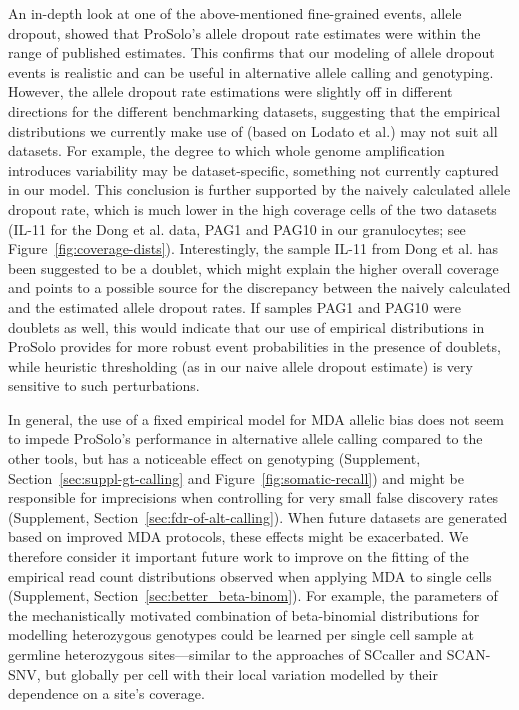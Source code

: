 \documentclass[12pt,inline]{wlscirep}
\begin{document}
An in-depth look at one of the above-mentioned fine-grained events, allele dropout, showed that ProSolo's allele dropout rate estimates were within the range of published estimates.
This confirms that our modeling of allele dropout events is realistic and can be useful in alternative allele calling and genotyping.
However, the allele dropout rate estimations were slightly off in different directions for the different benchmarking datasets, suggesting that the empirical distributions we currently make use of (based on Lodato et al.\cite{lodato_somatic_2015}) may not suit all datasets.
For example, the degree to which whole genome amplification introduces variability may be dataset-specific, something not currently captured in our model.
This conclusion is further supported by the naively calculated allele dropout rate, which is much lower in the high coverage cells of the two datasets (IL-11 for the Dong et al. data\cite{dong_accurate_2017}, PAG1 and PAG10 in our granulocytes; see Figure~\ref{fig:coverage-dists}).
Interestingly, the sample IL-11 from Dong et al.\cite{dong_accurate_2017} has been suggested to be a doublet\cite{luquette_identification_2019}, which might explain the higher overall coverage and points to a possible source for the discrepancy between the naively calculated and the estimated allele dropout rates.
If samples PAG1 and PAG10 were doublets as well, this would indicate that our use of empirical distributions in ProSolo provides for more robust event probabilities in the presence of doublets, while heuristic thresholding (as in our naive allele dropout estimate) is very sensitive to such perturbations.

In general, the use of a fixed empirical model for MDA allelic bias does not seem to impede ProSolo's performance in alternative allele calling compared to the other tools, but has a noticeable effect on genotyping (Supplement, Section~\ref{sec:suppl-gt-calling} and Figure~\ref{fig:somatic-recall}) and might be responsible for imprecisions when controlling for very small false discovery rates (Supplement, Section~\ref{sec:fdr-of-alt-calling}).
When future datasets are generated based on improved MDA protocols\cite{lahnemann_eleven_2020}, these effects might be exacerbated.
We therefore consider it important future work to improve on the fitting of the empirical read count distributions observed when applying MDA to single cells (Supplement, Section~\ref{sec:better_beta-binom}).
For example, the parameters of the mechanistically motivated combination of beta-binomial distributions for modelling heterozygous genotypes could be learned per single cell sample at germline heterozygous sites---similar to the approaches of SCcaller and SCAN-SNV, but globally per cell with their local variation modelled by their dependence on a site's coverage.
\end{document}
